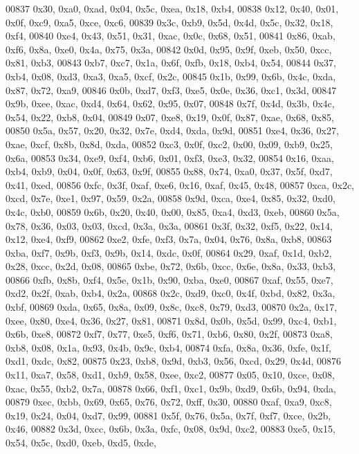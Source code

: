 \begin{DoxyCode}
00837   0x30, 0xa0, 0xad, 0x04, 0x5c, 0xea, 0x18, 0xb4,
00838   0x12, 0x40, 0x01, 0x0f, 0xc9, 0xa5, 0xce, 0xc6,
00839   0x3c, 0xb9, 0x5d, 0x4d, 0x5c, 0x32, 0x18, 0xf4,
00840   0xe4, 0x43, 0x51, 0x31, 0xac, 0x0c, 0x68, 0x51,
00841   0x86, 0xab, 0xf6, 0x8a, 0xe0, 0x4a, 0x75, 0x3a,
00842   0x0d, 0x95, 0x9f, 0xeb, 0x50, 0xcc, 0x81, 0xb3,
00843   0xb7, 0xc7, 0x1a, 0x6f, 0xfb, 0x18, 0xb4, 0x54,
00844   0x37, 0xb4, 0x08, 0xd3, 0xa3, 0xa5, 0xcf, 0x2c,
00845   0x1b, 0x99, 0x6b, 0x4c, 0xda, 0x87, 0x72, 0xa9,
00846   0x0b, 0xd7, 0xf3, 0xe5, 0x0e, 0x36, 0xc1, 0x3d,
00847   0x9b, 0xee, 0xac, 0xd4, 0x64, 0x62, 0x95, 0x07,
00848   0x7f, 0x4d, 0x3b, 0x4c, 0x54, 0x22, 0xb8, 0x04,
00849   0x07, 0xe8, 0x19, 0x0f, 0x87, 0xae, 0x68, 0x85,
00850   0x5a, 0x57, 0x20, 0x32, 0x7e, 0xd4, 0xda, 0x9d,
00851   0xe4, 0x36, 0x27, 0xae, 0xcf, 0x8b, 0x8d, 0xda,
00852   0xc3, 0x0f, 0xc2, 0x00, 0x09, 0xb9, 0x25, 0x6a,
00853   0x34, 0xe9, 0xf4, 0xb6, 0x01, 0xf3, 0xe3, 0x32,
00854   0x16, 0xaa, 0xb4, 0xb9, 0x04, 0x0f, 0x63, 0x9f,
00855   0x88, 0x74, 0xa0, 0x37, 0x5f, 0xd7, 0x41, 0xed,
00856   0xfc, 0x3f, 0xaf, 0xe6, 0x16, 0xaf, 0x45, 0x48,
00857   0xca, 0x2c, 0xcd, 0x7e, 0xe1, 0x97, 0x59, 0x2a,
00858   0x9d, 0xca, 0xe4, 0x85, 0x32, 0xd0, 0x4c, 0xb0,
00859   0x6b, 0x20, 0x40, 0x00, 0x85, 0xa4, 0xd3, 0xeb,
00860   0x5a, 0x78, 0x36, 0x03, 0x03, 0xcd, 0x3a, 0x3a,
00861   0x3f, 0x32, 0xf5, 0x22, 0x14, 0x12, 0xe4, 0xf9,
00862   0xe2, 0xfe, 0xf3, 0x7a, 0x04, 0x76, 0x8a, 0xb8,
00863   0xba, 0xf7, 0x9b, 0xf3, 0x9b, 0x14, 0xdc, 0x0f,
00864   0x29, 0xaf, 0x1d, 0xb2, 0x28, 0xcc, 0x2d, 0x08,
00865   0xbe, 0x72, 0x6b, 0xcc, 0x6e, 0x8a, 0x33, 0xb3,
00866   0xfb, 0x8b, 0xf4, 0x5e, 0x1b, 0x90, 0xba, 0xe0,
00867   0xaf, 0x55, 0xe7, 0xd2, 0x2f, 0xab, 0xb4, 0x2a,
00868   0x2c, 0xd9, 0xc0, 0x4f, 0xbd, 0x82, 0x3a, 0xbf,
00869   0xda, 0x65, 0x8a, 0x09, 0x8c, 0xc8, 0x79, 0xd3,
00870   0x2a, 0x17, 0xee, 0x80, 0xe4, 0x36, 0x27, 0x81,
00871   0x8d, 0x0b, 0x5d, 0x99, 0xc4, 0xb1, 0x6b, 0xe8,
00872   0xf7, 0x77, 0xe5, 0xf6, 0x71, 0xb6, 0x80, 0x2f,
00873   0xa8, 0xb8, 0x08, 0x1a, 0x93, 0x4b, 0x9c, 0xb4,
00874   0xfa, 0x8a, 0x36, 0xfe, 0x1f, 0xd1, 0xdc, 0x82,
00875   0x23, 0xb8, 0x9d, 0xb3, 0x56, 0xcd, 0x29, 0x4d,
00876   0x11, 0xa7, 0x58, 0xd1, 0xb9, 0x58, 0xee, 0xc2,
00877   0x05, 0x10, 0xce, 0x08, 0xac, 0x55, 0xb2, 0x7a,
00878   0x66, 0xf1, 0xc1, 0x9b, 0xd9, 0x6b, 0x94, 0xda,
00879   0xec, 0xbb, 0x69, 0x65, 0x76, 0x72, 0xff, 0x30,
00880   0xaf, 0xa9, 0xc8, 0x19, 0x24, 0x04, 0xd7, 0x99,
00881   0x5f, 0x76, 0x5a, 0x7f, 0xf7, 0xce, 0x2b, 0x46,
00882   0x3d, 0xcc, 0x6b, 0x3a, 0xfc, 0x08, 0x9d, 0xc2,
00883   0xe5, 0x15, 0x54, 0x5c, 0xd0, 0xeb, 0xd5, 0xde,

\end{DoxyCode}
